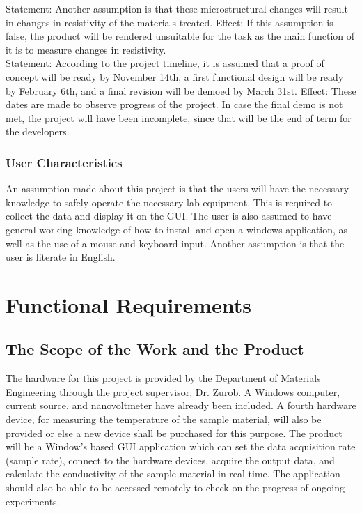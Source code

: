 \documentclass[12pt, titlepage]{article}
\begin{document}
\noindent Statement: Another assumption is that these microstructural changes will result in changes in resistivity of the materials treated. 
Effect: If this assumption is false, the product will be rendered unsuitable for the task as the main function of it is to measure changes in resistivity.\\

\noindent Statement: According to the project timeline, it is assumed that a proof of concept will be ready by November 14th, a first functional design will be ready by February 6th, and a final revision will be demoed by March 31st.
Effect: These dates are made to observe progress of the project. In case the final demo is not met, the project will have been incomplete, since that will be the end of term for the developers.

\subsubsection{User Characteristics}
An assumption made about this project is that the users will have the necessary knowledge to safely operate the necessary lab equipment. This is required to collect the data and display it on the GUI. 
The user is also assumed to have general working knowledge of how to install and open a windows application, as well as the use of a mouse and keyboard input. Another assumption is that the user is literate in English.

\section{Functional Requirements}
\subsection{The Scope of the Work and the Product}

The hardware for this project is provided by the Department of Materials Engineering through the project supervisor, Dr. Zurob. A Windows computer, current source, and nanovoltmeter have already been included. A fourth hardware device, for measuring the temperature of the sample material, will also be provided or else a new device shall be purchased for this purpose. The product will be a Window's based GUI application which can set the data acquisition rate (sample rate), connect to the hardware devices, acquire the output data, and calculate the conductivity of the sample material in real time. The application should also be able to be accessed remotely to check on the progress of ongoing experiments. \\
\end{document}
